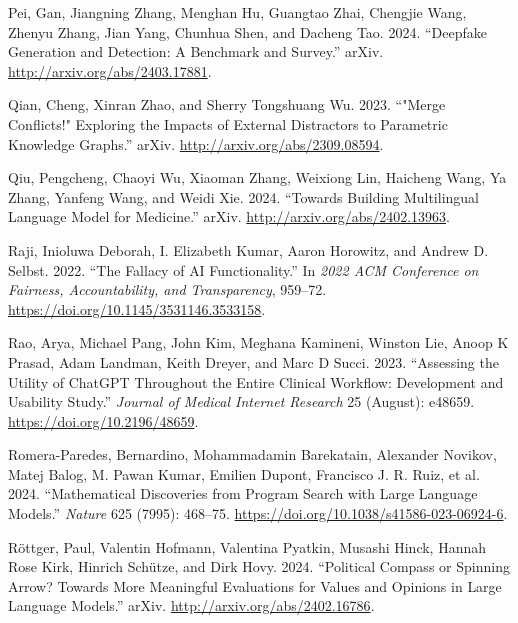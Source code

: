 \documentclass[
  Letterpaper,
]{scrbook}
\newlength{\cslhangindent}
\newenvironment{CSLReferences}[2] %
 {\begin{list}{}{%
  \setlength{\itemindent}{0pt}
  \setlength{\leftmargin}{0pt}
  \setlength{\parsep}{0pt}
  \ifodd #1
   \setlength{\leftmargin}{\cslhangindent}
   \setlength{\itemindent}{-1\cslhangindent}
  \fi
  \setlength{\itemsep}{#2\baselineskip}}}
 {\end{list}}
\begin{document}
\begin{CSLReferences}{1}{0}
Pei, Gan, Jiangning Zhang, Menghan Hu, Guangtao Zhai, Chengjie Wang,
Zhenyu Zhang, Jian Yang, Chunhua Shen, and Dacheng Tao. 2024.
{``Deepfake {Generation} and {Detection}: {A} {Benchmark} and
{Survey}.''} arXiv. \url{http://arxiv.org/abs/2403.17881}.

Qian, Cheng, Xinran Zhao, and Sherry Tongshuang Wu. 2023. {``"{Merge}
{Conflicts}!" {Exploring} the {Impacts} of {External} {Distractors} to
{Parametric} {Knowledge} {Graphs}.''} arXiv.
\url{http://arxiv.org/abs/2309.08594}.

Qiu, Pengcheng, Chaoyi Wu, Xiaoman Zhang, Weixiong Lin, Haicheng Wang,
Ya Zhang, Yanfeng Wang, and Weidi Xie. 2024. {``Towards {Building}
{Multilingual} {Language} {Model} for {Medicine}.''} arXiv.
\url{http://arxiv.org/abs/2402.13963}.

Raji, Inioluwa Deborah, I. Elizabeth Kumar, Aaron Horowitz, and Andrew
D. Selbst. 2022. {``The {Fallacy} of {AI} {Functionality}.''} In
\emph{2022 {ACM} {Conference} on {Fairness}, {Accountability}, and
{Transparency}}, 959--72. \url{https://doi.org/10.1145/3531146.3533158}.

Rao, Arya, Michael Pang, John Kim, Meghana Kamineni, Winston Lie, Anoop
K Prasad, Adam Landman, Keith Dreyer, and Marc D Succi. 2023.
{``Assessing the {Utility} of {ChatGPT} {Throughout} the {Entire}
{Clinical} {Workflow}: {Development} and {Usability} {Study}.''}
\emph{Journal of Medical Internet Research} 25 (August): e48659.
\url{https://doi.org/10.2196/48659}.

Romera-Paredes, Bernardino, Mohammadamin Barekatain, Alexander Novikov,
Matej Balog, M. Pawan Kumar, Emilien Dupont, Francisco J. R. Ruiz, et
al. 2024. {``Mathematical Discoveries from Program Search with Large
Language Models.''} \emph{Nature} 625 (7995): 468--75.
\url{https://doi.org/10.1038/s41586-023-06924-6}.

Röttger, Paul, Valentin Hofmann, Valentina Pyatkin, Musashi Hinck,
Hannah Rose Kirk, Hinrich Schütze, and Dirk Hovy. 2024. {``Political
{Compass} or {Spinning} {Arrow}? {Towards} {More} {Meaningful}
{Evaluations} for {Values} and {Opinions} in {Large} {Language}
{Models}.''} arXiv. \url{http://arxiv.org/abs/2402.16786}.


\end{CSLReferences}
\end{document}
